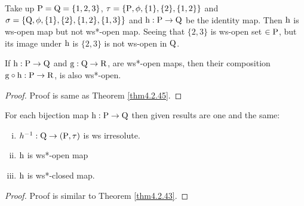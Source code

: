 \begin{exm}\label{exam4.2.48}
Take up $\mathrm{P} = \mathrm{Q} = \{1, 2, 3\}$, $\tau = \{\mathrm{P}, \phi, \{1\}, \{2\}, \{1, 2\}\}$ and $\sigma =\{\mathrm{Q}, \phi, \{1\}, \{2\}, \{1, 2\},\{1,3\}\}$ and $\mathrm{h}: \mathrm{P} \to \mathrm{Q}$ be the identity map. Then $\mathrm{h}$ is ws-open map but not ws*-open map. Seeing that $\{2, 3\}$ is ws-open set $\in\mathrm{P}$, but its image under $\mathrm{h}$ is $\{2, 3\}$ is not ws-open in $\mathrm{Q}$.
\end{exm}

\begin{thm}\label{4.2.49}
If $\mathrm{h}: \mathrm{P} \to \mathrm{Q}$ and $\mathrm{g}: \mathrm{Q} \to \mathrm{R}$, are ws*-open maps, then their composition $\mathrm{g} \circ \mathrm{h}: \mathrm{P} \to \mathrm{R}$, is also ws*-open.
\end{thm}

\begin{proof}
Proof is same as Theorem \ref{thm4.2.45}.
\end{proof}

\begin{thm}\label{thm4.2.50} 
For each bijection map $\mathrm{h}: \mathrm{P} \to \mathrm{Q}$ then given results are one and the same:
\begin{enumerate}[(i)]
\item $h^{-1}: \mathrm{Q}\to (\mathrm{P}, \tau)$ is ws irresolute.
\item $\mathrm{h}$ is ws*-open map
\item $\mathrm{h}$ is ws*-closed map.
\end{enumerate}
\end{thm}

\begin{proof}
Proof is similar to Theorem \ref{thm4.2.43}.
\end{proof}
